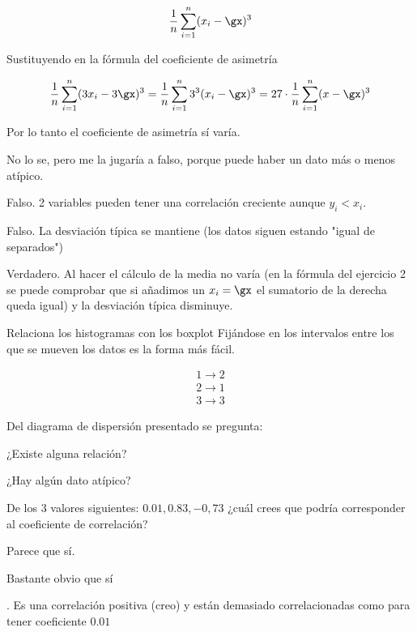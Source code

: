 \begin{problem}[5]
\[\frac{1}{n} \sum_{i=1}^n (x_i-\gx)^3\]

Sustituyendo en la fórmula del coeficiente de asimetría

\[\frac{1}{n} \sum_{i=1}^n (3x_i - 3\gx)^3 = \frac{1}{n} \sum_{i=1}^n 3^3 (x_i-\gx)^3 = 27 \cdot \frac{1}{n} \sum_{i=1}^n (x-\gx)^3\]

Por lo tanto el coeficiente de asimetría sí varía.

\spart No lo se, pero me la jugaría a falso, porque puede haber un dato más o menos atípico.

\spart Falso. 2 variables pueden tener una correlación creciente aunque $y_i<x_i$.

\spart Falso. La desviación típica se mantiene (los datos siguen estando "igual de separados")

\spart Verdadero. Al hacer el cálculo de la media no varía (en la fórmula del ejercicio 2 se puede comprobar que si añadimos un $x_i=\gx$ el sumatorio de la derecha queda igual) y la desviación típica disminuye.

\end{problem}

\begin{problem}[7]
Relaciona los histogramas con los boxplot
\solution
Fijándose en los intervalos entre los que se mueven los datos es la forma más fácil.

\[\begin{array}{cc}
1 \to 2\\
2 \to 1\\
3 \to 3
\end{array}\]

\end{problem}

\begin{problem}[8]
Del diagrama de dispersión presentado se pregunta:

\ppart ¿Existe alguna relación?

\ppart ¿Hay algún dato atípico?

\ppart De los 3 valores siguientes: $0.01, 0.83, -0,73$ ¿cuál crees que podría corresponder al coeficiente de correlación?

\solution

\spart Parece que sí.

\spart Bastante obvio que sí

. Es una correlación positiva (creo) y están demasiado correlacionadas como para tener coeficiente $0.01$

\end{problem}

